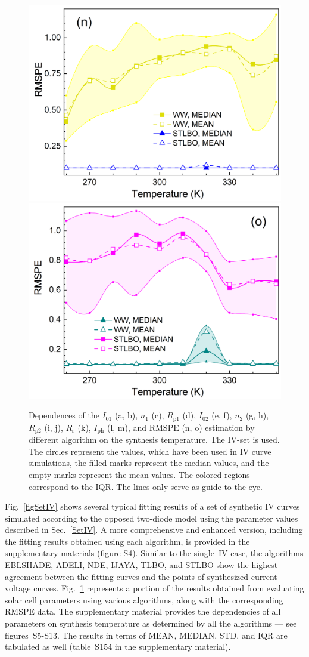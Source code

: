 \documentclass[a4paper,fleqn]{cas-sc}
\begin{document}
\begin{figure}[]
        \includegraphics[width=.32\textwidth]{AfigN}
        \includegraphics[width=.32\textwidth]{AfigO}
	  \caption{Dependences of the $I_{01}$ (a, b), $n_1$ (c), $R_\mathrm{p1}$ (d), $I_{02}$ (e, f),
               $n_2$ (g, h), $R_\mathrm{p2}$ (i, j), $R_\mathrm{s}$ (k), $I_\mathrm{ph}$ (l, m), and RMSPE (n, o)
               estimation by different algorithm on the synthesis temperature.
               The IV-set is used.
               The circles represent the values, which have been used in IV curve simulations,
               the filled marks represent the median values, and the empty marks represent the mean values.
               The colored regions correspond to the IQR.
               The lines only serve as guide to the eye.
               }\label{figTDepIVset}
\end{figure}

Fig.~\ref{figSetIV} shows several typical fitting results of a set of synthetic IV curves
simulated according to the opposed two-diode model using the parameter values described in Sec.~\ref{SetIV}.
A more comprehensive and enhanced version, including the fitting results obtained using each algorithm,
is provided in the supplementary materials (figure S4).
Similar to the single--IV case,
the algorithms EBLSHADE, ADELI, NDE, IJAYA, TLBO, and STLBO show
the highest agreement between the fitting curves and the points of synthesized current-voltage curves.
Fig.~\ref{figTDepIVset} represents a portion of the results obtained from evaluating solar cell parameters using various algorithms,
along with the corresponding RMSPE data.
The supplementary material provides the dependencies of all parameters on synthesis temperature
as determined by all the algorithms --- see figures~S5-S13.
The results in terms of MEAN, MEDIAN, STD, and IQR are tabulated as well (table~S154 in the supplementary material).
\end{document}
